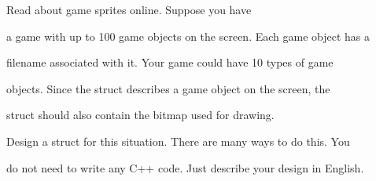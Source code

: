 Read about game sprites online. Suppose you have

a game with up to 100 game objects on the screen. Each game object has a

filename associated with it. Your game could have 10 types of game

objects. Since the struct describes a game object on the screen, the

struct should also contain the bitmap used for drawing.



Design a struct for this situation. There are many ways to do this. You

do not need to write any C++ code. Just describe your design in English.

